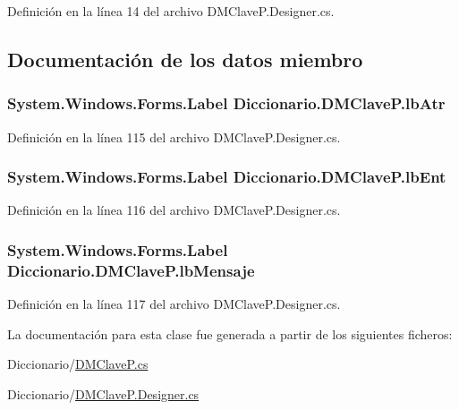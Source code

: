 Definición en la línea 14 del archivo D\-M\-Clave\-P.\-Designer.\-cs.



\subsection{Documentación de los datos miembro}
\hypertarget{class_diccionario_1_1_d_m_clave_p_aa5474584d9fc3ec4b2b1e65146c0c131}{
\subsubsection[{lb\-Atr}]{\setlength{\rightskip}{0pt plus 5cm}System.\-Windows.\-Forms.\-Label Diccionario.\-D\-M\-Clave\-P.\-lb\-Atr}}\label{class_diccionario_1_1_d_m_clave_p_aa5474584d9fc3ec4b2b1e65146c0c131}


Definición en la línea 115 del archivo D\-M\-Clave\-P.\-Designer.\-cs.

\hypertarget{class_diccionario_1_1_d_m_clave_p_a3cd9f68a2444c4a1868a295bd65832e7}{
\subsubsection[{lb\-Ent}]{\setlength{\rightskip}{0pt plus 5cm}System.\-Windows.\-Forms.\-Label Diccionario.\-D\-M\-Clave\-P.\-lb\-Ent}}\label{class_diccionario_1_1_d_m_clave_p_a3cd9f68a2444c4a1868a295bd65832e7}


Definición en la línea 116 del archivo D\-M\-Clave\-P.\-Designer.\-cs.

\hypertarget{class_diccionario_1_1_d_m_clave_p_a48afafd8bdc2823104bab68d05189cae}{
\subsubsection[{lb\-Mensaje}]{\setlength{\rightskip}{0pt plus 5cm}System.\-Windows.\-Forms.\-Label Diccionario.\-D\-M\-Clave\-P.\-lb\-Mensaje}}\label{class_diccionario_1_1_d_m_clave_p_a48afafd8bdc2823104bab68d05189cae}


Definición en la línea 117 del archivo D\-M\-Clave\-P.\-Designer.\-cs.



La documentación para esta clase fue generada a partir de los siguientes ficheros\-:\begin{DoxyCompactItemize}
\item 
Diccionario/\hyperlink{_d_m_clave_p_8cs}{D\-M\-Clave\-P.\-cs}\item 
Diccionario/\hyperlink{_d_m_clave_p_8_designer_8cs}{D\-M\-Clave\-P.\-Designer.\-cs}\end{DoxyCompactItemize}
